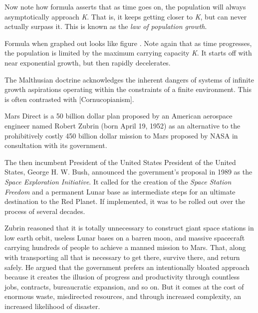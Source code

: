 Now note how formula  asserts that as time goes on, the population will always asymptotically approach {\it K}. That is, it keeps getting closer to {\it K}, but can never actually surpass it. This is known as the {\it law of population growth}.
\crlf

\startformula
{}
\stopformula
\crlf

Formula  when graphed out looks like figure . Note again that as time progresses, the population is limited by the maximum carrying capacity {\it K}. It starts off with near exponential growth, but then rapidly decelerates.

    {}

The Malthusian doctrine acknowledges the inherent dangers of systems of infinite growth aspirations operating within the constraints of a finite environment. This is often contrasted with [Cornucopianism].

Mars Direct is a \type{$}50 billion dollar plan proposed by an American aerospace engineer named Robert Zubrin (born April 19, 1952) as an alternative to the prohibitively costly \type{$}450 billion dollar mission to Mars proposed by NASA in consultation with its government.

The then incumbent President of the United States President of the United States, George H. W. Bush, announced the government's proposal in 1989 as the {\it Space Exploration Initiative}. It called for the creation of the {\it Space Station Freedom} and a permanent Lunar base as intermediate steps for an ultimate destination to the Red Planet. If implemented, it was to be rolled out over the process of several decades.

Zubrin reasoned that it is totally unnecessary to construct giant space stations in low earth orbit, useless Lunar bases on a barren moon, and massive spacecraft carrying hundreds of people to achieve a manned mission to Mars. That, along with transporting all that is necessary to get there, survive there, and return safely. He argued that the government prefers an intentionally bloated approach because it creates the illusion of progress and productivity through countless jobs, contracts, bureaucratic expansion, and so on. But it comes at the cost of enormous waste, misdirected resources, and through increased complexity, an increased likelihood of disaster.

